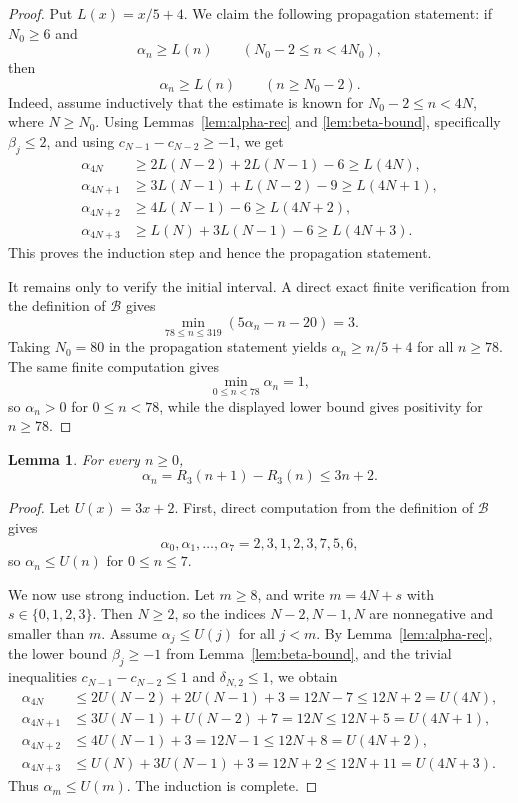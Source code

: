 \documentclass[10pt,a4paper]{amsart}
\newtheorem{lemma}[theorem]{Lemma}
\newcommand{\BaseB}{\mathcal B}
\begin{document}
\begin{proof}
Put $L(x)=x/5+4$. We claim the following propagation statement: if $N_0\ge 6$ and
\[
\alpha_n\ge L(n)\qquad (N_0-2\le n<4N_0),
\]
then
\[
\alpha_n\ge L(n)\qquad (n\ge N_0-2).
\]
Indeed, assume inductively that the estimate is known for $N_0-2\le n<4N$, where $N\ge N_0$. Using Lemmas~\ref{lem:alpha-rec} and \ref{lem:beta-bound}, specifically $\beta_j\le 2$, and using $c_{N-1}-c_{N-2}\ge -1$, we get
\[
\begin{aligned}
\alpha_{4N}&\ge 2L(N-2)+2L(N-1)-6\ge L(4N),\\
\alpha_{4N+1}&\ge 3L(N-1)+L(N-2)-9\ge L(4N+1),\\
\alpha_{4N+2}&\ge 4L(N-1)-6\ge L(4N+2),\\
\alpha_{4N+3}&\ge L(N)+3L(N-1)-6\ge L(4N+3).
\end{aligned}
\]
This proves the induction step and hence the propagation statement.

It remains only to verify the initial interval. A direct exact finite verification from the definition of $\BaseB$ gives
\[
\min_{78\le n\le 319}(5\alpha_n-n-20)=3.
\]
Taking $N_0=80$ in the propagation statement yields $\alpha_n\ge n/5+4$ for all $n\ge 78$. The same finite computation gives
\[
\min_{0\le n<78}\alpha_n=1,
\]
so $\alpha_n>0$ for $0\le n<78$, while the displayed lower bound gives positivity for $n\ge 78$.
\end{proof}

\begin{lemma}\label{lem:alpha-upper}
For every $n\ge 0$,
\[
\alpha_n=R_3(n+1)-R_3(n)\le 3n+2.
\]
\end{lemma}

\begin{proof}
Let $U(x)=3x+2$. First, direct computation from the definition of $\BaseB$ gives
\[
\alpha_0,\alpha_1,\ldots,\alpha_7=2,3,1,2,3,7,5,6,
\]
so $\alpha_n\le U(n)$ for $0\le n\le 7$.

We now use strong induction. Let $m\ge 8$, and write $m=4N+s$ with $s\in\{0,1,2,3\}$. Then $N\ge 2$, so the indices $N-2,N-1,N$ are nonnegative and smaller than $m$. Assume $\alpha_j\le U(j)$ for all $j<m$. By Lemma~\ref{lem:alpha-rec}, the lower bound $\beta_j\ge -1$ from Lemma~\ref{lem:beta-bound}, and the trivial inequalities $c_{N-1}-c_{N-2}\le 1$ and $\delta_{N,2}\le 1$, we obtain
\[
\begin{aligned}
\alpha_{4N}&\le 2U(N-2)+2U(N-1)+3=12N-7\le 12N+2=U(4N),\\
\alpha_{4N+1}&\le 3U(N-1)+U(N-2)+7=12N\le 12N+5=U(4N+1),\\
\alpha_{4N+2}&\le 4U(N-1)+3=12N-1\le 12N+8=U(4N+2),\\
\alpha_{4N+3}&\le U(N)+3U(N-1)+3=12N+2\le 12N+11=U(4N+3).
\end{aligned}
\]
Thus $\alpha_m\le U(m)$. The induction is complete.
\end{proof}
\end{document}
